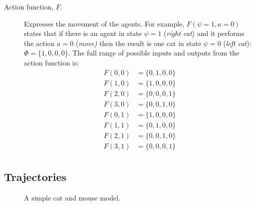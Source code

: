 \documentclass{article}
\begin{document}
\begin{description}
\item[Action function, $F$.] Expresses the movement of the agents. For example, $F(\psi=1, a=0)$ states that if there is an agent in state $\psi=1$ (\textit{right cat}) and it performs the action $a=0$ (\textit{move)} then the result is one cat in state $\psi=0$ (\textit{left cat}):  $\Phi=\{1,0,0,0\}$. The full range of possible inputs and outputs from the action function is:
\[
\begin{aligned}
F(0, 0) &= \{0,1,0,0\}\\
F(1, 0) &= \{1,0,0,0\}\\
F(2, 0) &= \{0,0,0,1\}\\
F(3, 0) &= \{0,0,1,0\}\\
F(0, 1) &= \{1,0,0,0\}\\
F(1, 1) &= \{0,1,0,0\}\\
F(2, 1) &= \{0,0,1,0\}\\
F(3, 1) &= \{0,0,0,1\}\\
\end{aligned}
\]

\end{description}

\subsection{Trajectories}

\begin{figure}
	\centering
	\caption{A simple cat and mouse model.\label{fig:AB-MCMC-1}}
\end{figure}
\end{document}

